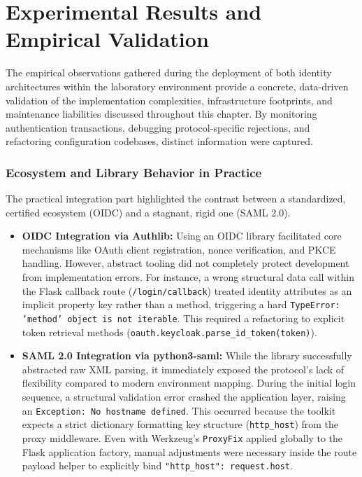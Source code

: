 \documentclass[../memoire.tex]{subfiles}
\begin{document}
\section{Experimental Results and Empirical Validation}

The empirical observations gathered during the deployment of both identity architectures within the laboratory environment provide a concrete, data-driven validation of the implementation complexities, infrastructure footprints, and maintenance liabilities discussed throughout this chapter. By monitoring authentication transactions, debugging protocol-specific rejections, and refactoring configuration codebases, distinct information were captured.

\subsubsection{Ecosystem and Library Behavior in Practice}

The practical integration part highlighted the contrast between a standardized, certified ecosystem (OIDC) and a stagnant, rigid one (SAML 2.0). 
\begin{itemize}
    \item \textbf{OIDC Integration via Authlib:} Using an OIDC library facilitated core mechanisms like OAuth client registration, nonce verification, and PKCE handling. However, abstract tooling did not completely protect development from implementation errors. For instance, a wrong structural data call within the Flask callback route (\texttt{/login/callback}) treated identity attributes as an implicit property key rather than a method, triggering a hard \texttt{TypeError: 'method' object is not iterable}. This required a refactoring to explicit token retrieval methods (\texttt{oauth.keycloak.parse\_id\_token(token)}).
    \item \textbf{SAML 2.0 Integration via python3-saml:} While the library successfully abstracted raw XML parsing, it immediately exposed the protocol's lack of flexibility compared to modern environment mapping. During the initial login sequence, a structural validation error crashed the application layer, raising an \texttt{Exception: No hostname defined}. This occurred because the toolkit expects a strict dictionary formatting key structure (\texttt{http\_host}) from the proxy middleware. Even with Werkzeug's \texttt{ProxyFix} applied globally to the Flask application factory, manual adjustments were necessary inside the route payload helper to explicitly bind \texttt{"http\_host": request.host}.
\end{itemize}
\end{document}
